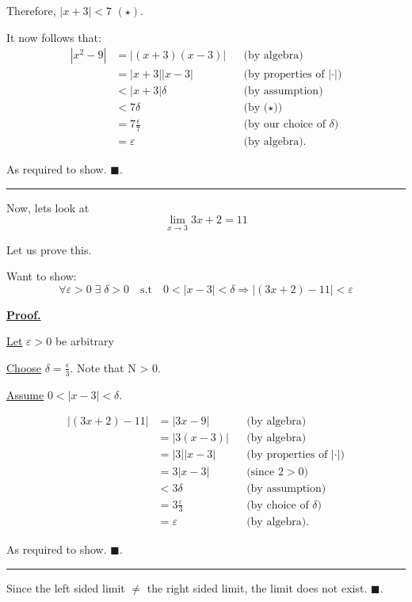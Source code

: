 \documentclass[]{article}
\begin{document}
Therefore, $|x+3| < 7$ $(\star)$.

It now follows that:
\begin{align*}
    |x^2 - 9| &= |(x+3)(x-3)| 
        && \text{(by algebra)} \\[6pt]
    &= |x+3||x-3| 
        && \text{(by properties of $|\cdot|$)} \\[6pt]
    &< |x+3|\delta 
        && \text{(by assumption)} \\[6pt]
    &< 7\delta 
        && \text{(by ($\star$))} \\[6pt]
    &= 7\frac{\epsilon}{7} 
        && \text{(by our choice of $\delta$)} \\[6pt]
    &= \varepsilon 
        && \text{(by algebra).}
\end{align*}

As required to show. $\blacksquare$.
\vspace{0.1in}
\hrule
\vspace{0.1in}
Now, lets look at 
\[
    \lim_{x\to3} 3x+2 = 11
\]

Let us prove this.

Want to show: 
\[
    \forall \varepsilon > 0\;\exists\;\delta >0 \quad \text{s.t} \quad 
    0 < |x-3| < \delta \Longrightarrow |(3x+2)-11| < \varepsilon
\]

\underline{\bf{Proof.}}

\underline{Let} $\varepsilon > 0$ be arbitrary

\medbreak

\underline{Choose} $\delta = \frac{\epsilon}{3} $. Note that N > 0.

\medbreak

\underline{Assume} $0 < |x-3| < \delta$.

\begin{align*}
    |(3x + 2) -11| &= |3x-9| 
        && \text{(by algebra)} \\[6pt]
    &= |3(x-3)| 
        && \text{(by algebra)} \\[6pt]
    &= |3||x-3| 
        && \text{(by properties of $|\cdot|$)} \\[6pt]
    &= 3|x-3| 
        && \text{(since $2>0$)} \\[6pt]
    &< 3\delta 
        && \text{(by assumption)} \\[6pt]
    &= 3\frac{\varepsilon}{3}
        && \text{(by choice of $\delta$)} \\[6pt]
    &= \varepsilon 
        && \text{(by algebra).}
\end{align*}

As required to show. $\blacksquare$.

\vspace{0.1in}
\hrule
\vspace{0.1in}



Since the left sided limit $\ne$ the right sided limit, the limit does not exist. $\blacksquare$.
\end{document}
